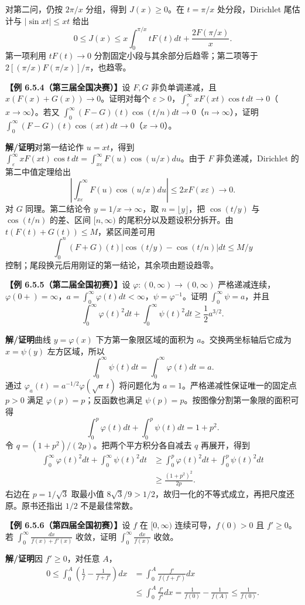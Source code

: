 \documentclass[UTF8,a4paper,11pt]{ctexart}
\newcommand{\ex}[1]{\par\noindent\textbf{【例 #1】}\;}
\newcommand{\sol}{\par\noindent\textbf{解/证明}\;}
\begin{document}
对第二问，仍按 $2\pi/x$ 分组，得到 $J(x)\ge0$。在 $t=\pi/x$ 处分段，Dirichlet 尾估计与 $|\sin xt|\le xt$ 给出
\[0\le J(x)\le x\int_0^{\pi/x}tF(t)dt+\frac{2F(\pi/x)}{x}.\]
第一项利用 $tF(t)\to0$ 分割固定小段与其余部分后趋零；第二项等于 $2[(\pi/x)F(\pi/x)]/\pi$，也趋零。
\ex{6.5.4（第三届全国决赛）}设 $F,G$ 非负单调递减，且 $x(F(x)+G(x))\to0$。证明对每个 $\varepsilon>0$，$\int_\varepsilon^\infty xF(xt)\cos t\,dt\to0$（$x\to\infty$）。若又 $\int_0^\infty(F-G)(t)\cos(t/n)dt\to0$（$n\to\infty$），证明 $\int_0^\infty(F-G)(t)\cos(xt)dt\to0$（$x\to0$）。
\sol 对第一结论作 $u=xt$，得到 $\int_\varepsilon^\infty xF(xt)\cos t\,dt=\int_{x\varepsilon}^\infty F(u)\cos(u/x)du$。由于 $F$ 非负递减，Dirichlet 的第二中值定理给出
\[\left|\int_{x\varepsilon}^\infty F(u)\cos(u/x)du\right|\le2xF(x\varepsilon)\longrightarrow0.\]
对 $G$ 同理。第二结论令 $y=1/x\to\infty$，取 $n=\lfloor y\rfloor$，把 $\cos(t/y)$ 与 $\cos(t/n)$ 的差、区间 $[n,\infty)$ 的尾积分以及题设积分拆开。由 $t(F(t)+G(t))\le M$，紧区间差可用
\[\int_0^n(F+G)(t)\left|\cos(t/y)-\cos(t/n)\right|dt\le M/y\]
控制；尾段换元后用刚证的第一结论，其余项由题设趋零。
\enlargethispage{6\baselineskip}
\ex{6.5.5（第二届全国初赛）}设 $\varphi:(0,\infty)\to(0,\infty)$ 严格递减连续，$\varphi(0+)=\infty$，$a=\int_0^\infty\varphi(t)dt<\infty$，$\psi=\varphi^{-1}$。证明 $\int_0^\infty\psi=a$，并且
\[\int_0^\infty\varphi(t)^2dt+\int_0^\infty\psi(t)^2dt\ge\frac12a^{3/2}.\]
\sol 曲线 $y=\varphi(x)$ 下方第一象限区域的面积为 $a$。交换两坐标轴后它成为 $x=\psi(y)$ 左方区域，所以
\[\int_0^\infty\psi(t)dt=\int_0^\infty\varphi(t)dt=a.\]
通过 $\varphi_a(t)=a^{-1/2}\varphi(\sqrt a\,t)$ 将问题化为 $a=1$。严格递减性保证唯一的固定点 $p>0$ 满足 $\varphi(p)=p$；反函数也满足 $\psi(p)=p$。按图像分割第一象限的面积可得
\[\int_0^p\varphi(t)dt+\int_0^p\psi(t)dt=1+p^2.\]
令 $q=(1+p^2)/(2p)$。把两个平方积分各自减去 $q$ 再展开，得到
\begin{align*}
\int_0^\infty\varphi(t)^2dt+\int_0^\infty\psi(t)^2dt
&\ge\int_0^p\varphi(t)^2dt+\int_0^p\psi(t)^2dt\\
&\ge \frac{(1+p^2)^2}{2p}.
\end{align*}
右边在 $p=1/\sqrt3$ 取最小值 $8\sqrt3/9>1/2$，故归一化的不等式成立，再把尺度还原。原书还指出 $1/2$ 不是最佳常数。
\ex{6.5.6（第四届全国初赛）}设 $f$ 在 $[0,\infty)$ 连续可导，$f(0)>0$ 且 $f'\ge0$。若 $\int_0^\infty\frac{dx}{f(x)+f'(x)}$ 收敛，证明 $\int_0^\infty\frac{dx}{f(x)}$ 收敛。
\sol 因 $f'\ge0$，对任意 $A$，
\begin{align*}
0\le\int_0^A\left(\frac1f-\frac1{f+f'}\right)dx
&=\int_0^A\frac{f'}{f(f+f')}dx\\
&\le\int_0^A\frac{f'}{f^2}dx
=\frac1{f(0)}-\frac1{f(A)}\le\frac1{f(0)}.
\end{align*}
\end{document}
